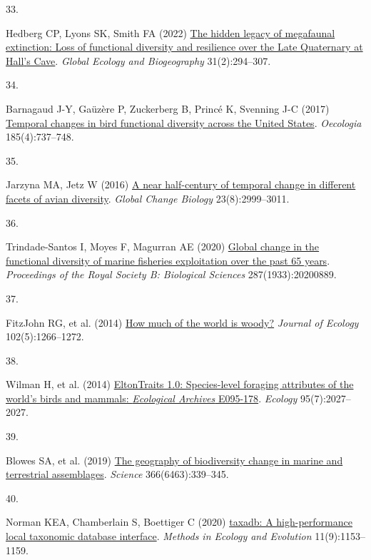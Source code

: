 \documentclass{article}
\newlength{\cslhangindent}
\newlength{\csllabelwidth}
\newlength{\cslentryspacingunit} %
\newenvironment{CSLReferences}[2] %
 {%
  \setlength{\parindent}{0pt}
  \ifodd #1
  \let\oldpar\par
  \def\par{\hangindent=\cslhangindent\oldpar}
  \fi
  \setlength{\parskip}{#2\cslentryspacingunit}
 }%
 {}
\newcommand{\CSLLeftMargin}[1]{\parbox[t]{\csllabelwidth}{#1}}
\newcommand{\CSLRightInline}[1]{\parbox[t]{\linewidth - \csllabelwidth}{#1}\break}
\begin{document}
\begin{CSLReferences}{0}{0}
\leavevmode{}%
\CSLLeftMargin{33. }%
\CSLRightInline{Hedberg CP, Lyons SK, Smith FA (2022)
\href{https://doi.org/10.1111/geb.13428}{The hidden legacy of megafaunal
extinction: Loss of functional diversity and resilience over the Late
Quaternary at Hall{'}s Cave}. \emph{Global Ecology and Biogeography}
31(2):294--307.}

\leavevmode{}%
\CSLLeftMargin{34. }%
\CSLRightInline{Barnagaud J-Y, Gaüzère P, Zuckerberg B, Princé K,
Svenning J-C (2017)
\href{https://doi.org/10.1007/s00442-017-3967-4}{Temporal changes in
bird functional diversity across the United States}. \emph{Oecologia}
185(4):737--748.}

\leavevmode{}%
\CSLLeftMargin{35. }%
\CSLRightInline{Jarzyna MA, Jetz W (2016)
\href{https://doi.org/10.1111/gcb.13571}{A near half-century of temporal
change in different facets of avian diversity}. \emph{Global Change
Biology} 23(8):2999--3011.}

\leavevmode{}%
\CSLLeftMargin{36. }%
\CSLRightInline{Trindade-Santos I, Moyes F, Magurran AE (2020)
\href{https://doi.org/10.1098/rspb.2020.0889}{Global change in the
functional diversity of marine fisheries exploitation over the past 65
years}. \emph{Proceedings of the Royal Society B: Biological Sciences}
287(1933):20200889.}

\leavevmode{}%
\CSLLeftMargin{37. }%
\CSLRightInline{FitzJohn RG, et al. (2014)
\href{https://doi.org/10.1111/1365-2745.12260}{How much of the world is
woody?} \emph{Journal of Ecology} 102(5):1266--1272.}

\leavevmode{}%
\CSLLeftMargin{38. }%
\CSLRightInline{Wilman H, et al. (2014)
\href{https://doi.org/10.1890/13-1917.1}{EltonTraits 1.0: Species-level
foraging attributes of the world's birds and mammals: {\emph{Ecological
Archives}} E095-178}. \emph{Ecology} 95(7):2027--2027.}

\leavevmode{}%
\CSLLeftMargin{39. }%
\CSLRightInline{Blowes SA, et al. (2019)
\href{https://doi.org/10.1126/science.aaw1620}{The geography of
biodiversity change in marine and terrestrial assemblages}.
\emph{Science} 366(6463):339--345.}

\leavevmode{}%
\CSLLeftMargin{40. }%
\CSLRightInline{Norman KEA, Chamberlain S, Boettiger C (2020)
\href{https://doi.org/10.1111/2041-210X.13440}{taxadb: A
high-performance local taxonomic database interface}. \emph{Methods in
Ecology and Evolution} 11(9):1153--1159.}


\end{CSLReferences}
\end{document}
